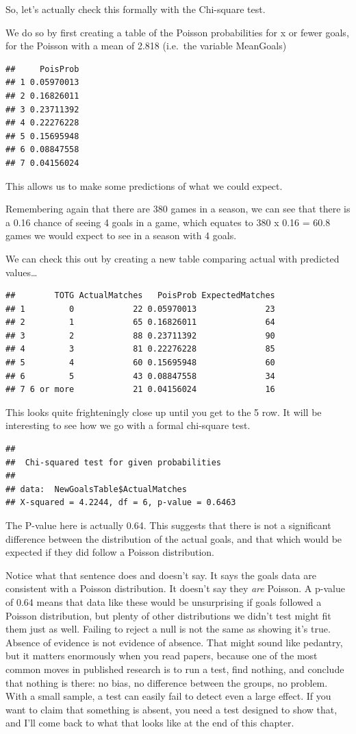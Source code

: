 \documentclass[
]{book}
\begin{document}
So, let's actually check this formally with the Chi-square test.

We do so by first creating a table of the Poisson probabilities for x or fewer goals, for the Poisson with a mean of 2.818 (i.e.~the variable MeanGoals)

\begin{verbatim}
##     PoisProb
## 1 0.05970013
## 2 0.16826011
## 3 0.23711392
## 4 0.22276228
## 5 0.15695948
## 6 0.08847558
## 7 0.04156024
\end{verbatim}

This allows us to make some predictions of what we could expect.

Remembering again that there are 380 games in a season, we can see that there is a 0.16 chance of seeing 4 goals in a game, which equates to 380 x 0.16 = 60.8 games we would expect to see in a season with 4 goals.

We can check this out by creating a new table comparing actual with predicted values\ldots{}

\begin{verbatim}
##        TOTG ActualMatches   PoisProb ExpectedMatches
## 1         0            22 0.05970013              23
## 2         1            65 0.16826011              64
## 3         2            88 0.23711392              90
## 4         3            81 0.22276228              85
## 5         4            60 0.15695948              60
## 6         5            43 0.08847558              34
## 7 6 or more            21 0.04156024              16
\end{verbatim}

This looks quite frighteningly close up until you get to the 5 row. It will be interesting to see how we go with a formal chi-square test.

\begin{verbatim}
## 
##  Chi-squared test for given probabilities
## 
## data:  NewGoalsTable$ActualMatches
## X-squared = 4.2244, df = 6, p-value = 0.6463
\end{verbatim}

The P-value here is actually 0.64. This suggests that there is not a significant difference between the distribution of the actual goals, and that which would be expected if they did follow a Poisson distribution.

Notice what that sentence does and doesn't say. It says the goals data are consistent with a Poisson distribution. It doesn't say they \emph{are} Poisson. A p-value of 0.64 means that data like these would be unsurprising if goals followed a Poisson distribution, but plenty of other distributions we didn't test might fit them just as well. Failing to reject a null is not the same as showing it's true. Absence of evidence is not evidence of absence. That might sound like pedantry, but it matters enormously when you read papers, because one of the most common moves in published research is to run a test, find nothing, and conclude that nothing is there: no bias, no difference between the groups, no problem. With a small sample, a test can easily fail to detect even a large effect. If you want to claim that something is absent, you need a test designed to show that, and I'll come back to what that looks like at the end of this chapter.
\end{document}
